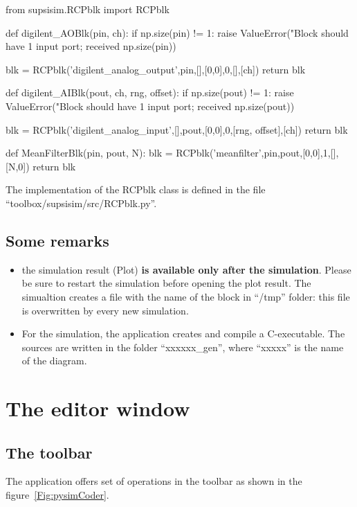 \begin{code}
from supsisim.RCPblk import RCPblk

def digilent_AOBlk(pin, ch):
    if np.size(pin) != 1:
        raise ValueError("Block should have 1 input port; received %
np.size(pin))

    blk = RCPblk('digilent_analog_output',pin,[],[0,0],0,[],[ch])
    return blk

def digilent_AIBlk(pout, ch, rng, offset):
    if np.size(pout) != 1:
        raise ValueError("Block should have 1 input port; received %
np.size(pout))

    blk = RCPblk('digilent_analog_input',[],pout,[0,0],0,[rng, offset],[ch])
    return blk

def MeanFilterBlk(pin, pout, N):
    blk = RCPblk('meanfilter',pin,pout,[0,0],1,[],[N,0])
    return blk

\end{code}

The implementation of the RCPblk class is defined in the file 
``toolbox/supsisim/src/RCPblk.py''.

\subsection{Some remarks}
\begin{itemize}
\item the simulation result (Plot) \textbf{is available only after the 
simulation}. Please be sure to restart the simulation before opening the plot 
result. The simualtion creates a file with the name of the block in ``/tmp'' 
folder: this file is overwritten by every new simulation.
\item For the simulation, the application creates and compile a C-executable. 
The sources are written in the folder ``xxxxxx\_gen'', where ``xxxxx'' is the 
name of the diagram.
\end{itemize}


\section{The editor window}

\subsection{The toolbar}

The application offers  set of operations in the toolbar as shown in the 
figure~\ref{Fig:pysimCoder}.

